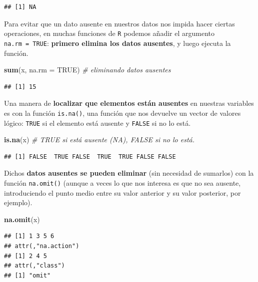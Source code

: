 \documentclass[11pt,]{book}
\newenvironment{Shaded}{\begin{snugshade}}{\end{snugshade}}
\newcommand{\CommentTok}[1]{\textcolor[rgb]{0.37,0.37,0.37}{\textit{#1}}}
\newcommand{\DataTypeTok}[1]{\textcolor[rgb]{0.27,0.27,0.27}{#1}}
\newcommand{\KeywordTok}[1]{\textcolor[rgb]{0.27,0.27,0.27}{\textbf{#1}}}
\newcommand{\NormalTok}[1]{#1}
\newcommand{\OtherTok}[1]{\textcolor[rgb]{0.37,0.37,0.37}{#1}}
\begin{document}
\begin{verbatim}
## [1] NA
\end{verbatim}

Para evitar que un dato ausente en nuestros datos nos impida hacer ciertas operaciones, en muchas funciones de \texttt{R} podemos añadir el argumento \texttt{na.rm\ =\ TRUE}: \textbf{primero elimina los datos ausentes}, y luego ejecuta la función.

\begin{Shaded}
\begin{Highlighting}[]
\KeywordTok{sum}\NormalTok{(x, }\DataTypeTok{na.rm =} \OtherTok{TRUE}\NormalTok{) }\CommentTok{# eliminando datos ausentes}
\end{Highlighting}
\end{Shaded}

\begin{verbatim}
## [1] 15
\end{verbatim}

Una manera de \textbf{localizar que elementos están ausentes} en nuestras variables es con la función \texttt{is.na()}, una función que nos devuelve un vector de valores lógico: \texttt{TRUE} si el elemento está ausente y \texttt{FALSE} si no lo está.

\begin{Shaded}
\begin{Highlighting}[]
\KeywordTok{is.na}\NormalTok{(x) }\CommentTok{# TRUE si está ausente (NA), FALSE si no lo está.}
\end{Highlighting}
\end{Shaded}

\begin{verbatim}
## [1] FALSE  TRUE FALSE  TRUE  TRUE FALSE FALSE
\end{verbatim}

Dichos \textbf{datos ausentes se pueden eliminar} (sin necesidad de sumarlos) con la función \texttt{na.omit()} (aunque a veces lo que nos interesa es que no sea ausente, introduciendo el punto medio entre su valor anterior y su valor posterior, por ejemplo).

\begin{Shaded}
\begin{Highlighting}[]
\KeywordTok{na.omit}\NormalTok{(x)}
\end{Highlighting}
\end{Shaded}

\begin{verbatim}
## [1] 1 3 5 6
## attr(,"na.action")
## [1] 2 4 5
## attr(,"class")
## [1] "omit"
\end{verbatim}
\end{document}
